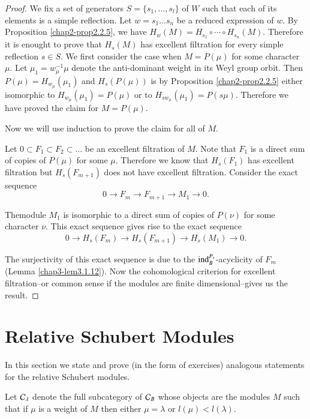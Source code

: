 \begin{proof}
We fix a set of generators $S=\{s_{1},\ldots,s_{l}\}$ of $W$ such that
each of its elements is a simple reflection. Let $w=s_{1}\ldots s_{n}$
be a reduced expression of $w$. By Proposition \ref{chap2-prop2.2.5},
we have $H_{w}(M)=H_{s_{1}}\circ\cdots\circ H_{s_{n}}(M)$. Therefore
it is enought to prove that $H_{s}(M)$ has excellent filtration for
every simple reflection $s\in S$. We first consider the case when
$M=P(\mu)$ for some character $\mu$. Let $\mu_{1}=w^{-1}_{\mu}\mu$
denote the anti-dominant weight in its Weyl group orbit. Then
$P(\mu)=H_{w_{\mu}}(\mu_{1})$ and $H_{s}(P(\mu))$ is by Proposition
\ref{chap2-prop2.2.5} either isomorphic to
$H_{w_{\mu}}(\mu_{1})=P(\mu)$ or to
$H_{sw_{\mu}}(\mu_{1})=P(s\mu)$. Therefore we have proved the claim
for $M=P(\mu)$. 

Now we will use induction to prove the claim for all of $M$.

Let $0\subset F_{1}\subset F_{2}\subset \ldots$ be an excellent
filtration of $M$. Note that $F_{1}$ is a direct sum of copies of
$P(\mu)$ for some $\mu$. Therefore we know that $H_{s}(F_{1})$ has
excellent filtration but $H_{s}(F_{m+1})$ does not have excellent
filtration. Consider the exact sequence
$$
0\to F_{m}\to F_{m+1}\to M_{1}\to 0.
$$

The\pageoriginale module\label{page32} $M_{1}$ is isomorphic to a direct sum of
copies of $P(\nu)$ for some character $\nu$. This exact sequence gives
rise to the exact sequence
$$
0\to H_{s}(F_{m})\to H_{s}(F_{m+1})\to H_{s}(M_{1})\to 0.
$$

The surjectivity of this exact sequence is due to the
$\operatorname{ind}^{P_{s}}_{B}$-acyclicity of $F_{m}$ (Lemma
\ref{chap3-lem3.1.12}). Now the cohomological criterion for excellent
filtration--or common sense if the modules are finite
dimensional--gives us the result.
\end{proof}

\section{Relative Schubert Modules}\label{chap3-sec3.3}

In this section we state and prove (in the form of exercises)
analogous statements for the relative Schubert modules.

\begin{definition}\label{chap3-defi3.3.1}
Let $\mathcal{C}_{\lambda}$ denote the full subcategory of $\mathcal{C}_{B}$ whose
objects are the modules $M$ such that if $\mu$ is a weight of $M$ then
either $\mu=\lambda$ or $l(\mu)<l(\lambda)$.
\end{definition}

